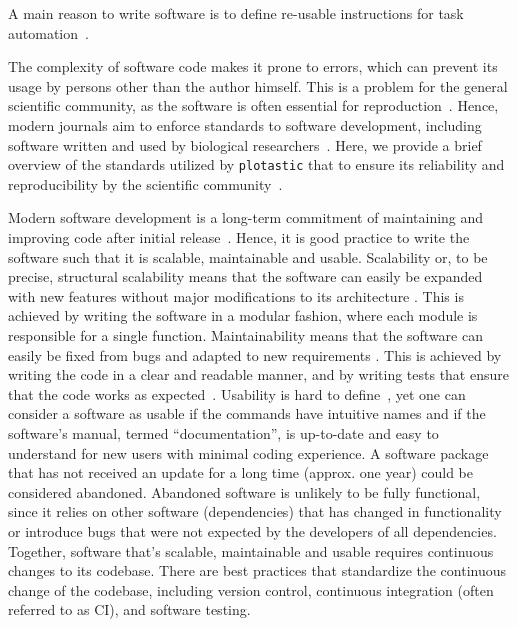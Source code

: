


A main reason to write software is to define re-usable instructions for task
automation~\cite{narztReusabilityConceptProcess1998}.

\label{sec:code_quality}
The complexity of software code makes it prone to errors, which can prevent
its usage by persons other than the author himself. This is a problem for the
general scientific community, as the software is often essential for
reproduction~\cite{sandveTenSimpleRules2013}. Hence, modern journals aim to
enforce standards to software development, including software written and used
by biological researchers~\cite{smithJournalOpenSource2018}. Here, we provide a
brief overview of the standards utilized by \texttt{plotastic} that to ensure
its reliability and reproducibility by the scientific
community~\cite{pengReproducibleResearchComputational2011}.


Modern software development is a long-term commitment of maintaining and
improving code after initial release~\cite{boswellArtReadableCode2011}. Hence,
it is good practice to write the software such that it is scalable, maintainable
and usable. Scalability or, to be precise, structural scalability means that the
software can easily be expanded with new features without major modifications to
its architecture \cite{bondiCharacteristicsScalabilityTheir2000}. This is
achieved by writing the software in a modular fashion, where each module is
responsible for a single function. Maintainability means that the software can
easily be fixed from bugs and adapted to new requirements
\cite{kazmanMaintainability2020}. This is achieved by writing the code in a
clear and readable manner, and by writing tests that ensure that the code works
as expected~\cite{boswellArtReadableCode2011}. Usability is hard to
define~\cite{brookeSUSQuickDirty1996}, yet one can consider a software as usable
if the commands have intuitive names and if the software's manual, termed
``documentation'', is up-to-date and easy to understand for new users with
minimal coding experience. A software package that has not received an update
for a long time (approx. one year) could be considered abandoned. Abandoned
software is unlikely to be fully functional, since it relies on other software
(dependencies) that has changed in functionality or introduce bugs that were not
expected by the developers of all dependencies. Together, software that's
scalable, maintainable and usable requires continuous changes to its codebase.
There are best practices that standardize the continuous change of the codebase,
including version control, continuous integration (often referred to as CI), and
software testing.

